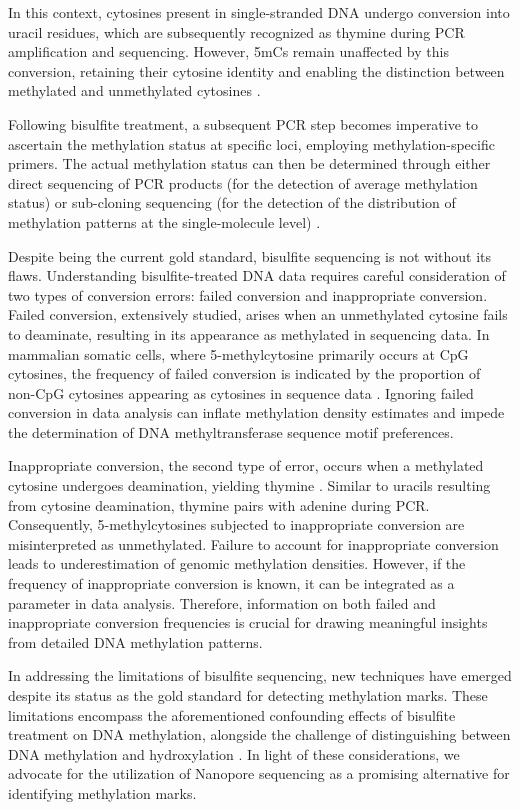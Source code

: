 In this context, cytosines present in single-stranded DNA undergo conversion into uracil residues, which are subsequently recognized as thymine during \ac{PCR} amplification and sequencing. However, \acp{5mC} remain unaffected by this conversion, retaining their cytosine identity and enabling the distinction between methylated and unmethylated cytosines \citep{bisulfite2}. 

Following bisulfite treatment, a subsequent \ac{PCR} step becomes imperative to ascertain the methylation status at specific loci, employing methylation-specific primers. The actual methylation status can then be determined through either direct sequencing of \ac{PCR} products (for the detection of average methylation status) or sub-cloning sequencing (for the detection of the distribution of methylation patterns at the single-molecule level) \citep{bisulfite2}.

Despite being the current gold standard, bisulfite sequencing is not without its flaws. Understanding bisulfite-treated DNA data requires careful consideration of two types of conversion errors: failed conversion and inappropriate conversion. Failed conversion, extensively studied, arises when an unmethylated cytosine fails to deaminate, resulting in its appearance as methylated in sequencing data. In mammalian somatic cells, where 5-methylcytosine primarily occurs at \ac{CpG} cytosines, the frequency of failed conversion is indicated by the proportion of non-\ac{CpG} cytosines appearing as cytosines in sequence data \citep{bisulfite_failed_conv}. Ignoring failed conversion in data analysis can inflate methylation density estimates and impede the determination of DNA methyltransferase sequence motif preferences.

Inappropriate conversion, the second type of error, occurs when a methylated cytosine undergoes deamination, yielding thymine \citep{bisulfite_inappr_conv}. Similar to uracils resulting from cytosine deamination, thymine pairs with adenine during \ac{PCR}. Consequently, 5-methylcytosines subjected to inappropriate conversion are misinterpreted as unmethylated. Failure to account for inappropriate conversion leads to underestimation of genomic methylation densities. However, if the frequency of inappropriate conversion is known, it can be integrated as a parameter in data analysis. Therefore, information on both failed and inappropriate conversion frequencies is crucial for drawing meaningful insights from detailed DNA methylation patterns.

In addressing the limitations of bisulfite sequencing, new techniques have emerged despite its status as the gold standard for detecting methylation marks. These limitations encompass the aforementioned confounding effects of bisulfite treatment on DNA methylation, alongside the challenge of distinguishing between DNA methylation and hydroxylation \citep{ont_vs_bisulfite}. In light of these considerations, we advocate for the utilization of Nanopore sequencing as a promising alternative for identifying methylation marks.

